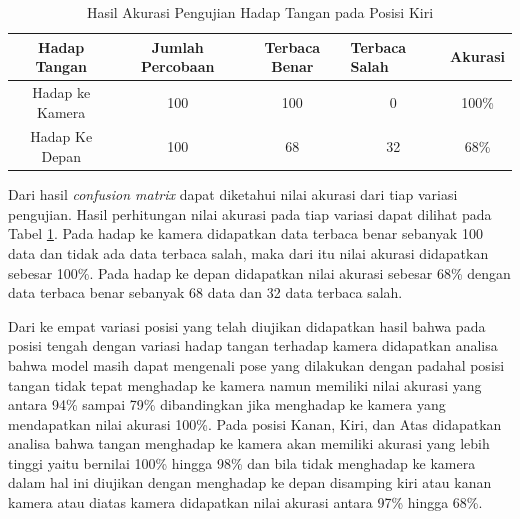 \begin{enumerate}
  \begin{table}[H]
    \centering
    \caption{Hasil Akurasi Pengujian Hadap Tangan pada Posisi Kiri}
    \label{tab:hasilposisiatas}
    \begin{tabular}{|c|c|c|c|c|}
      \hline
      Hadap Tangan & Jumlah Percobaan & Terbaca Benar & \multicolumn{1}{l|}{Terbaca Salah} & \multicolumn{1}{l|}{Akurasi} \\ \hline
      Hadap ke Kamera         & 100              & 100           & 0                                  & 100\%                        \\ \hline
      Hadap Ke Depan         & 100              & 68           & 32                                  & 68\%                    \\
      \hline
      \end{tabular}
  \end{table}

  Dari hasil \emph{confusion matrix} dapat diketahui nilai akurasi dari tiap variasi pengujian. Hasil perhitungan nilai akurasi pada tiap variasi dapat dilihat pada Tabel \ref{tab:hasilposisiatas}. Pada hadap ke kamera didapatkan data terbaca benar sebanyak 100 data dan tidak ada data terbaca salah, maka dari itu nilai akurasi didapatkan sebesar 100\%. Pada hadap ke depan didapatkan nilai akurasi sebesar 68\% dengan data terbaca benar sebanyak 68 data dan 32 data terbaca salah.

\end{enumerate}

Dari ke empat variasi posisi yang telah diujikan didapatkan hasil bahwa pada posisi tengah dengan variasi hadap tangan terhadap kamera didapatkan analisa bahwa model masih dapat mengenali pose yang dilakukan dengan padahal posisi tangan tidak tepat menghadap ke kamera namun memiliki nilai akurasi yang antara 94\% sampai 79\% dibandingkan jika menghadap ke kamera yang mendapatkan nilai akurasi 100\%. Pada posisi Kanan, Kiri, dan Atas didapatkan analisa bahwa tangan menghadap ke kamera akan memiliki akurasi yang lebih tinggi yaitu bernilai 100\% hingga 98\% dan bila tidak menghadap ke kamera dalam hal ini diujikan dengan menghadap ke depan disamping kiri atau kanan kamera atau diatas kamera didapatkan nilai akurasi antara 97\% hingga 68\%.

